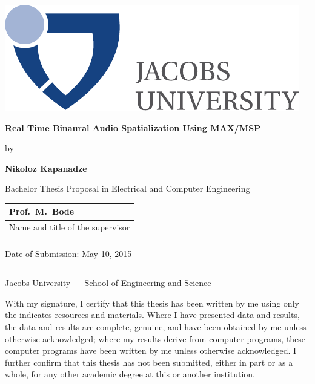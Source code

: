 \documentclass[a4paper,12pt,oneside]{article}
\newcommand{\myname}{Nikoloz Kapanadze}
\newcommand{\mytitle}{Real Time Binaural Audio Spatialization Using MAX/MSP}
\newcommand{\mysupervisor}{Prof.~M.~Bode}
\begin{document}
  \thispagestyle{empty}
  \begin{flushright}
    \includegraphics[scale=0.7]{bsc-logo}
  \end{flushright}
  \vspace{20mm}
  \begin{center}
    \huge
    \textbf{\mytitle}
  \end{center}
  \vspace*{4mm}
  \begin{center}
   \Large by
  \end{center}
  \vspace*{4mm}
  \begin{center}
    \Large
    \textbf{\myname}
  \end{center}
  \vspace*{20mm}
  \begin{center}
    \large
    Bachelor Thesis Proposal in Electrical and Computer Engineering
  \end{center}
  \vfill
  \begin{flushright}
    \large
    \begin{tabular}{l}
      \mysupervisor \\
      \hline
      Name and title of the supervisor \\
      \\
    \end{tabular}
  \end{flushright}
  \vspace*{8mm}
\begin{flushleft}
\large
Date of Submission: May 10, 2015 \\
\rule{\textwidth}{1pt}
\end{flushleft}
\begin{center}
\Large Jacobs University --- School of Engineering and Science
\end{center}
\newpage
\thispagestyle{empty}

  With my signature, I certify that this thesis has been written by me
  using only the indicates resources and materials. Where I have
  presented data and results, the data and results are complete,
  genuine, and have been obtained by me unless otherwise acknowledged;
  where my results derive from computer programs, these computer
  programs have been written by me unless otherwise acknowledged. I
  further confirm that this thesis has not been submitted, either in
  part or as a whole, for any other academic degree at this or another
  institution.
\end{document}
